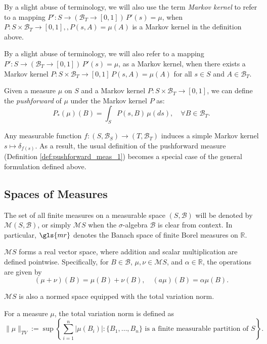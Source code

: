By a slight abuse of terminology, we will also use the term \emph{Markov kernel} to refer to a mapping  $P': S \to (\mathcal{B}_T \to [0,1]) \, P'(s)=\mu$, when $P : S \times \mathcal{B}_T \to [0,1], , P(s,A)=\mu(A)$ is a Markov kernel in the definition above.

By a slight abuse of terminology, we will also refer to a mapping $ P' : S \to (\mathcal{B}_T \to [0,1])\, P'(s)=\mu $, as a Markov kernel, when there exists a Markov kernel $ P : S \times \mathcal{B}_T \to [0,1] \, P(s,A)=\mu (A) $  for all $s \in S $ and $A \in \mathcal{B}_T$.

\begin{definition}
  Given a measure $\mu$ on $S$ and a Markov kernel $P: S \times \mathcal{B}_T \to [0,1]$, we can define the \emph{pushforward} of $\mu$   under the Markov kernel $P$  as:
$$
P_*(\mu)(B) = \int_S P(s, B) \, \mu(ds), \quad \forall B \in \mathcal{B}_T.
$$
\end{definition}

Any measurable function \( f : (S, \mathcal{B}_S) \to (T, \mathcal{B}_T) \) induces a simple Markov kernel $ s \mapsto \delta_{f(s)} $. As a result,  the usual definition of the pushforward measure (Definition \ref{def:pushforward_meas_1}) becomes a special case of the general formulation defined above.

\subsection{Spaces of Measures}

The set of all finite measures on a measurable space $(S, \mathcal{B})$ will be denoted by $\mathcal{M}(S, \mathcal{B})$, 
or simply $\mathcal{M}S$ when the $\sigma$-algebra $\mathcal{B}$ is clear from context. In particular, $\gls{mr}$ denotes  the Banach space of finite Borel measures on $\mathbb{R}$.

 $\mathcal{M}S $ forms a real vector space, where addition and scalar multiplication are defined pointwise. Specifically, for  $ B \in \mathcal{B} $, $ \mu, \nu \in \mathcal{M}S $, and $ \alpha \in \mathbb{R} $, the operations are given by
$$
(\mu + \nu)(B) = \mu(B) + \nu(B), \quad (a\mu)(B) = \alpha \mu(B).
$$


\( \mathcal{M}S \) is also a normed space equipped with the total variation norm. 

\begin{definition}
  For a measure \( \mu \), the total variation norm is defined as
$$
\|\mu\|_{TV} := \sup \left\{ \sum_{i=1}^n |\mu(B_i)| : \{B_1, \dots, B_n\} \text{ is a finite measurable partition of } S \right\}.
$$
\end{definition}

